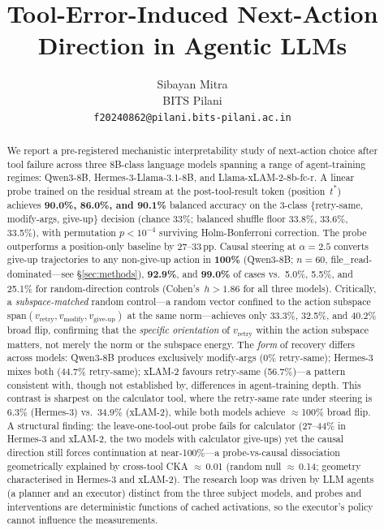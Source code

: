 \documentclass{article}
\title{Tool-Error-Induced Next-Action Direction in Agentic LLMs}
\author{Sibayan Mitra \\ BITS Pilani \\ \texttt{f20240862@pilani.bits-pilani.ac.in}}
\begin{document}
\maketitle

\begin{abstract}
We report a pre-registered mechanistic interpretability study of
next-action choice after tool failure across three 8B-class language
models spanning a range of agent-training regimes: Qwen3-8B,
Hermes-3-Llama-3.1-8B, and Llama-xLAM-2-8b-fc-r.
A linear probe trained on the residual stream at the post-tool-result
token (position~$t^*$) achieves \textbf{90.0\%, 86.0\%, and 90.1\%}
balanced accuracy on the 3-class \{retry-same, modify-args, give-up\}
decision (chance 33\%; balanced shuffle floor 33.8\%, 33.6\%, 33.5\%),
with permutation $p<10^{-4}$ surviving Holm-Bonferroni correction.
The probe outperforms a position-only baseline by 27--33\,pp.
Causal steering at $\alpha{=}2.5$ converts give-up trajectories to
any non-give-up action in \textbf{100\%} (Qwen3-8B; $n{=}60$,
file\_read-dominated---see \S\ref{sec:methods}), \textbf{92.9\%}, and
\textbf{99.0\%} of cases vs.\ 5.0\%, 5.5\%, and 25.1\% for
random-direction controls (Cohen's~$h>1.86$ for all three models).
Critically, a \emph{subspace-matched} random control---a random vector
confined to the action subspace span$(v_{\text{retry}},v_{\text{modify}},
v_{\text{give-up}})$ at the same norm---achieves only 33.3\%, 32.5\%, and
40.2\% broad flip, confirming that the \emph{specific orientation} of
$v_{\text{retry}}$ within the action subspace matters, not merely the
norm or the subspace energy.
The \emph{form} of recovery differs across models: Qwen3-8B
produces exclusively modify-args (0\% retry-same); Hermes-3 mixes both
(44.7\% retry-same); xLAM-2 favours retry-same (56.7\%)---a pattern
consistent with, though not established by, differences in
agent-training depth.
This contrast is sharpest on the calculator tool, where the
retry-same rate under steering is 6.3\% (Hermes-3) vs.\ 34.9\%
(xLAM-2), while both models achieve $\approx$100\% broad flip.
A structural finding: the leave-one-tool-out probe fails for
calculator (27--44\% in Hermes-3 and xLAM-2, the two models with
calculator give-ups) yet the causal direction still forces continuation
at near-100\%---a probe-vs-causal dissociation geometrically explained
by cross-tool CKA $\approx$\,0.01 (random null $\approx$\,0.14;
geometry characterised in Hermes-3 and xLAM-2).
The research loop was driven by LLM agents (a planner and an
executor) distinct from the three subject models, and probes and
interventions are deterministic functions of cached activations, so
the executor's policy cannot influence the measurements.
\end{abstract}
\end{document}
